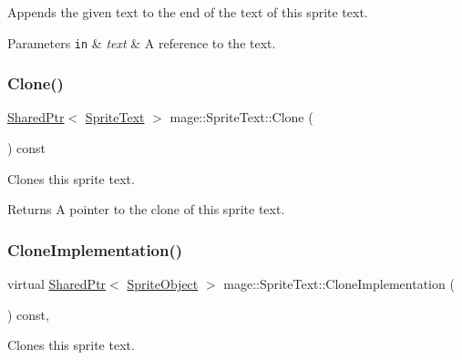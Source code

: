Appends the given text to the end of the text of this sprite text.


\begin{DoxyParams}[1]{Parameters}
\mbox{\tt in}  & {\em text} & A reference to the text. \\
\hline
\end{DoxyParams}
\hypertarget{classmage_1_1_sprite_text_a14e711a43a4482aa03f6cd9d59c26c79}{}\label{classmage_1_1_sprite_text_a14e711a43a4482aa03f6cd9d59c26c79} 
\subsubsection{\texorpdfstring{Clone()}{Clone()}}
{\footnotesize\ttfamily \hyperlink{namespacemage_a1e01ae66713838a7a67d30e44c67703e}{Shared\+Ptr}$<$ \hyperlink{classmage_1_1_sprite_text}{Sprite\+Text} $>$ mage\+::\+Sprite\+Text\+::\+Clone (\begin{DoxyParamCaption}{ }\end{DoxyParamCaption}) const}

Clones this sprite text.

\begin{DoxyReturn}{Returns}
A pointer to the clone of this sprite text. 
\end{DoxyReturn}
\hypertarget{classmage_1_1_sprite_text_acf74e687f38c6253bf5851bc4548352e}{}\label{classmage_1_1_sprite_text_acf74e687f38c6253bf5851bc4548352e} 
\subsubsection{\texorpdfstring{Clone\+Implementation()}{CloneImplementation()}}
{\footnotesize\ttfamily virtual \hyperlink{namespacemage_a1e01ae66713838a7a67d30e44c67703e}{Shared\+Ptr}$<$ \hyperlink{classmage_1_1_sprite_object}{Sprite\+Object} $>$ mage\+::\+Sprite\+Text\+::\+Clone\+Implementation (\begin{DoxyParamCaption}{ }\end{DoxyParamCaption}) const\hspace{0.3cm}{\ttfamily [private]}, {}}

Clones this sprite text.

